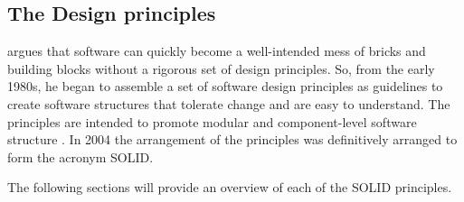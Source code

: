 \subsection{The Design principles} \label{subsec_design_principles}

\textcite[78]{robert_c_martin_clean_2018} argues that software can quickly become a
well-intended mess of bricks and building blocks without a rigorous set of design
principles. So, from the early 1980s, he began to assemble a set of software design
principles as guidelines to create software structures that tolerate change and are easy
to understand. The principles are intended to promote modular and component-level software
structure \parencite[79]{robert_c_martin_clean_2018}. In 2004 the arrangement of the
principles was definitively arranged to form the acronym SOLID. 

The following sections will provide an overview of each of the SOLID principles.





